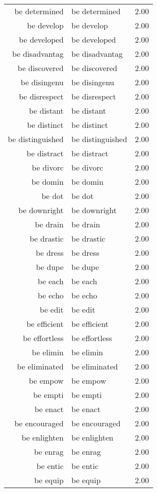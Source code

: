\begin{table}[ht]
\begin{tabular}{rlr}
  be determined & be determined & 2.00 \\ 
  be develop & be develop & 2.00 \\ 
  be developed & be developed & 2.00 \\ 
  be disadvantag & be disadvantag & 2.00 \\ 
  be discovered & be discovered & 2.00 \\ 
  be disingenu & be disingenu & 2.00 \\ 
  be disrespect & be disrespect & 2.00 \\ 
  be distant & be distant & 2.00 \\ 
  be distinct & be distinct & 2.00 \\ 
  be distinguished & be distinguished & 2.00 \\ 
  be distract & be distract & 2.00 \\ 
  be divorc & be divorc & 2.00 \\ 
  be domin & be domin & 2.00 \\ 
  be dot & be dot & 2.00 \\ 
  be downright & be downright & 2.00 \\ 
  be drain & be drain & 2.00 \\ 
  be drastic & be drastic & 2.00 \\ 
  be dress & be dress & 2.00 \\ 
  be dupe & be dupe & 2.00 \\ 
  be each & be each & 2.00 \\ 
  be echo & be echo & 2.00 \\ 
  be edit & be edit & 2.00 \\ 
  be efficient & be efficient & 2.00 \\ 
  be effortless & be effortless & 2.00 \\ 
  be elimin & be elimin & 2.00 \\ 
  be eliminated & be eliminated & 2.00 \\ 
  be empow & be empow & 2.00 \\ 
  be empti & be empti & 2.00 \\ 
  be enact & be enact & 2.00 \\ 
  be encouraged & be encouraged & 2.00 \\ 
  be enlighten & be enlighten & 2.00 \\ 
  be enrag & be enrag & 2.00 \\ 
  be entic & be entic & 2.00 \\ 
  be equip & be equip & 2.00 \\ 

\end{tabular}
\end{table}
